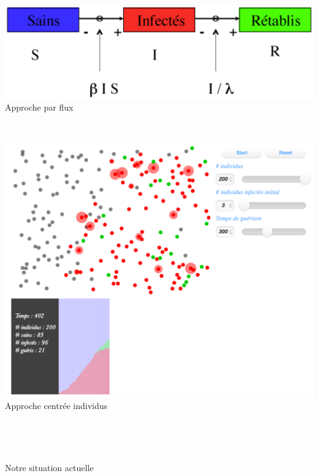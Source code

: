 \documentclass[a4paper]{cours-bdd}
\begin{document}
\begin{frame}[fragile]
  \begin{minipage}[t]{0.45\columnwidth}
        \vspace{0.0cm}
        \includegraphics[width=\linewidth]{modeleSIR.png} \\
        Approche par flux
  \end{minipage}
  \hfill \
  \begin{minipage}[t]{0.45\columnwidth}
        \vspace{0.0cm}
        \includegraphics[width=0.6\linewidth]{approcheSMA.png} \\
        Approche centrée individus
  \end{minipage}
  \
  
\end{frame}



\begin{frame}
  \hfill \
  \begin{center}
    \Huge
    Notre situation actuelle
  \end{center}
  \hfill \

\end{frame}



\end{document}
